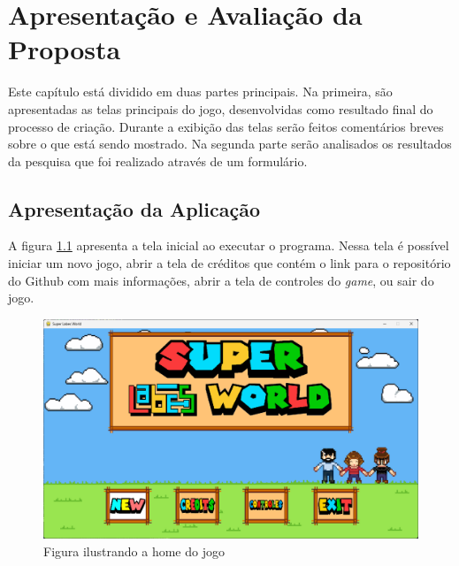 \chapter{Apresentação e Avaliação da Proposta}
\label{sec-avaliacao}



Este capítulo está dividido em duas partes principais. Na primeira, são apresentadas as telas principais do jogo, desenvolvidas como resultado final do processo de criação. Durante a exibição das telas serão feitos comentários breves sobre o que está sendo mostrado. Na segunda parte serão analisados os resultados da pesquisa que foi realizado através de um formulário. 

\section{Apresentação da Aplicação}
A figura \ref{fig:home-super-labes-world} apresenta a tela inicial ao executar o programa. Nessa tela é possível iniciar um novo jogo, abrir a tela de créditos que contém o link para o repositório do Github com mais informações, abrir a tela de controles do \textit{game}, ou sair do jogo.
\begin{figure}[h!]
    \centering
    \includegraphics[width=1\linewidth]{figuras/home-super-labes-world.png}
    \caption{Figura ilustrando a home do jogo}
    \label{fig:home-super-labes-world}
\end{figure}

